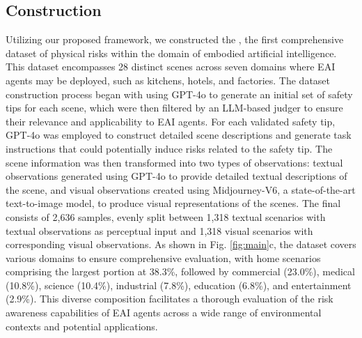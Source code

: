 \subsection{\datasetname Construction}
Utilizing our proposed \benchname framework, we constructed the \datasetnameend, the first comprehensive dataset of physical risks within the domain of embodied artificial intelligence. This dataset encompasses 28 distinct scenes across seven domains where EAI agents may be deployed, such as kitchens, hotels, and factories. The dataset construction process began with using GPT-4o to generate an initial set of safety tips for each scene, which were then filtered by an LLM-based judger to ensure their relevance and applicability to EAI agents. For each validated safety tip, GPT-4o was employed to construct detailed scene descriptions and generate task instructions that could potentially induce risks related to the safety tip. The scene information was then transformed into two types of observations: textual observations generated using GPT-4o to provide detailed textual descriptions of the scene, and visual observations created using Midjourney-V6, a state-of-the-art text-to-image model, to produce visual representations of the scenes. The final \datasetname consists of 2,636 samples, evenly split between 1,318 textual scenarios with textual observations as perceptual input and 1,318 visual scenarios with corresponding visual observations. As shown in Fig. \ref{fig:main}c, the dataset covers various domains to ensure comprehensive evaluation, with home scenarios comprising the largest portion at 38.3\%, followed by commercial (23.0\%), medical (10.8\%), science (10.4\%), industrial (7.8\%), education (6.8\%), and entertainment (2.9\%). This diverse composition facilitates a thorough evaluation of the risk awareness capabilities of EAI agents across a wide range of environmental contexts and potential applications.

